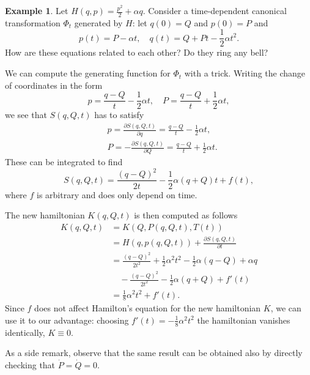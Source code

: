 \documentclass[english,fontsize=11pt,paper=b5]{scrbook}
\numberwithin{equation}{chapter}
\theoremstyle{definition}
\newtheorem{example}{Example}[chapter]
\begin{document}
    \begin{example}
      Let $H(q,p) = \frac{p^2}{2} + \alpha q$. Consider a time-dependent canonical transformation $\Phi_t$ generated by $H$: let $q(0) = Q$ and $p(0) = P$ and
      \begin{equation}\label{eq:unifaccm}
        p(t) = P - \alpha t, \quad
        q(t) = Q + Pt - \frac{1}{2}\alpha t^2.
      \end{equation}
      How are these equations related to each other? Do they ring any bell?

      We can compute the generating function for $\Phi_t$ with a trick. Writing the change of coordinates in the form
      \begin{equation}
        p = \frac{q-Q}{t}-\frac12\alpha t, \quad
        P = \frac{q-Q}{t} + \frac 12\alpha t,
      \end{equation}
      we see that $S(q,Q,t)$ has to satisfy
      \begin{align}
     & p = \frac{\partial S(q,Q,t)}{\partial q} = \frac{q-Q}{t} - \frac12\alpha t,   \\
     & P = - \frac{\partial S(q,Q,t)}{\partial Q} = \frac{q-Q}{t} + \frac12\alpha t.
      \end{align}
      These can be integrated to find
      \begin{equation}
        S(q,Q,t) = \frac{(q-Q)^2}{2t} - \frac12 \alpha (q+Q) t + f(t),
      \end{equation}
      where $f$ is arbitrary and does only depend on time.

      The new hamiltonian $K(q,Q,t)$ is then computed as follows
      \begin{align}
        K(q,Q,t) & = K(Q, P(q,Q,t), T(t))                                                          \\
                 & = H(q, p(q,Q,t)) + \frac{\partial S (q,Q,t)}{\partial t}                        \\
                 & = \frac{(q-Q)^2}{2t^2} + \frac12 \alpha^2 t^2 - \frac12 \alpha (q-Q) + \alpha q \\
                 & \quad - \frac{(q-Q)^2}{2t^2} - \frac12 \alpha(q+Q) + f'(t)                      \\
                 & = \frac{1}{8}\alpha^2t^2 + f'(t).
      \end{align}
      Since $f$ does not affect Hamilton's equation for the new hamiltonian $K$, we can use it to our advantage: choosing $f'(t) = - \frac{1}{8}\alpha^2t^2$ the hamiltonian vanishes identically, $K\equiv 0$.

      As a side remark, observe that the same result can be obtained also by directly checking that $\dot P = \dot Q = 0$.
    \end{example}
\end{document}
